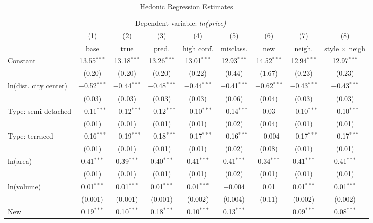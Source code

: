 \documentclass[]{article}
\begin{document}
\begin{table}[!htbp] \centering 
  \caption{Hedonic Regression Estimates} 
  \label{tab:hedreg} 
\footnotesize 
\begin{tabular}{@{\extracolsep{5pt}}lcccccccc} 
\toprule
 & \multicolumn{6}{c}{Dependent variable: \emph{ln(price)}} \\ 
\cmidrule{2-9} 
 & (1) & (2) & (3) & (4) & (5) & (6) & (7) & (8)\\ 
 & base & true & pred. & high conf. & misclass. & new & neigh. & style $\times$ neigh\\ 

\midrule
 Constant & 13.55$^{***}$ & 13.18$^{***}$ & 13.26$^{***}$ & 13.01$^{***}$ & 12.93$^{***}$ & 14.52$^{***}$ & 12.94$^{***}$ & 12.97$^{***}$ \\ 
  & (0.20) & (0.20) & (0.20) & (0.22) & (0.44) & (1.67) & (0.23) & (0.23) \\ 
  ln(dist. city center) & $-$0.52$^{***}$ & $-$0.44$^{***}$ & $-$0.48$^{***}$ & $-$0.44$^{***}$ & $-$0.41$^{***}$ & $-$0.62$^{***}$ & $-$0.43$^{***}$ & $-$0.43$^{***}$ \\ 
  & (0.03) & (0.03) & (0.03) & (0.03) & (0.06) & (0.04) & (0.03) & (0.03) \\ 
  Type: semi-detached & $-$0.11$^{***}$ & $-$0.12$^{***}$ & $-$0.12$^{***}$ & $-$0.10$^{***}$ & $-$0.14$^{***}$ & 0.03 & $-$0.10$^{***}$ & $-$0.10$^{***}$ \\ 
  & (0.01) & (0.01) & (0.01) & (0.01) & (0.02) & (0.04) & (0.01) & (0.01) \\ 
  Type: terraced & $-$0.16$^{***}$ & $-$0.19$^{***}$ & $-$0.18$^{***}$ & $-$0.17$^{***}$ & $-$0.16$^{***}$ & $-$0.004 & $-$0.17$^{***}$ & $-$0.17$^{***}$ \\ 
  & (0.01) & (0.01) & (0.01) & (0.01) & (0.02) & (0.08) & (0.01) & (0.01) \\ 
  ln(area) & 0.41$^{***}$ & 0.39$^{***}$ & 0.40$^{***}$ & 0.41$^{***}$ & 0.41$^{***}$ & 0.34$^{***}$ & 0.41$^{***}$ & 0.41$^{***}$ \\ 
  & (0.01) & (0.01) & (0.01) & (0.01) & (0.02) & (0.01) & (0.01) & (0.01) \\ 
  ln(volume) & 0.01$^{***}$ & 0.01$^{***}$ & 0.01$^{***}$ & 0.01$^{***}$ & $-$0.004 & 0.01 & 0.01$^{***}$ & 0.01$^{***}$ \\ 
  & (0.001) & (0.001) & (0.001) & (0.002) & (0.004) & (0.11) & (0.002) & (0.002) \\ 
  New & 0.19$^{***}$ & 0.10$^{***}$ & 0.18$^{***}$ & 0.10$^{***}$ & 0.13$^{***}$ &  & 0.09$^{***}$ & 0.08$^{***}$ \\ 

\end{tabular}
\end{table}
\end{document}

